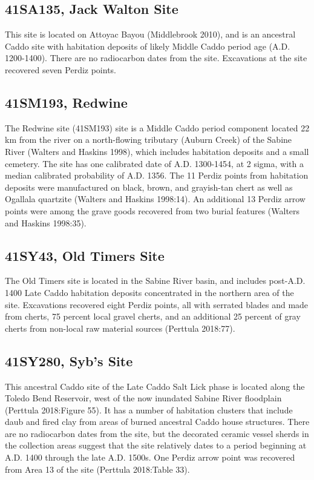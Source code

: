 \documentclass[review]{elsarticle}
\begin{document}
\subsection*{41SA135, Jack Walton Site}

This site is located on Attoyac Bayou (Middlebrook 2010), and is an ancestral Caddo site with habitation deposits of likely Middle Caddo period age (A.D. 1200-1400). There are no radiocarbon dates from the site. Excavations at the site recovered seven Perdiz points.

\subsection*{41SM193, Redwine}

The Redwine site (41SM193) site is a Middle Caddo period component located 22 km from the river on a north-flowing tributary (Auburn Creek) of the Sabine River (Walters and Haskins 1998), which includes habitation deposits and a small cemetery. The site has one calibrated date of A.D. 1300-1454, at 2 sigma, with a median calibrated probability of A.D. 1356. The 11 Perdiz points from habitation deposits were manufactured on black, brown, and grayish-tan chert as well as Ogallala quartzite (Walters and Haskins 1998:14). An additional 13 Perdiz arrow points were among the grave goods recovered from two burial features (Walters and Haskins 1998:35).

\subsection*{41SY43, Old Timers Site}

The Old Timers site is located in the Sabine River basin, and includes post-A.D. 1400 Late Caddo habitation deposits concentrated in the northern area of the site. Excavations recovered eight Perdiz points, all with serrated blades and made from cherts, 75 percent local gravel cherts, and an additional 25 percent of gray cherts from non-local raw material sources (Perttula 2018:77).

\subsection*{41SY280, Syb’s Site} 

This ancestral Caddo site of the Late Caddo Salt Lick phase is located along the Toledo Bend Reservoir, west of the now inundated Sabine River floodplain (Perttula 2018:Figure 55). It has a number of habitation clusters that include daub and fired clay from areas of burned ancestral Caddo house structures. There are no radiocarbon dates from the site, but the decorated ceramic vessel sherds in the collection areas suggest that the site relatively dates to a period beginning at A.D. 1400 through the late A.D. 1500s. One Perdiz arrow point was recovered from Area 13 of the site (Perttula 2018:Table 33).
\end{document}
